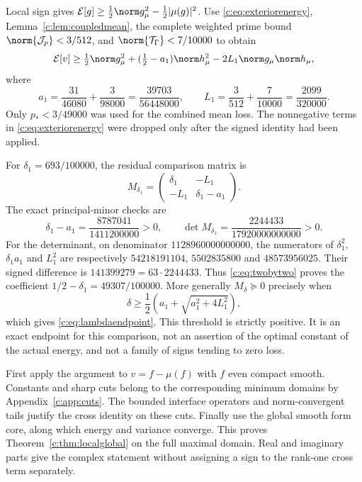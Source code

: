 \documentclass[11pt,a4paper]{article}
\numberwithin{equation}{section}
\theoremstyle{definition}\newtheorem{definition}[theorem]{Definition}
\theoremstyle{remark}\newtheorem{remark}[theorem]{Remark}
\newcommand{\E}{\mathcal E}\newcommand{\D}{\mathcal D}
\begin{document}
Local sign gives $\E[g]\ge\tfrac12\norm g_\mu^2-\tfrac12|\mu(g)|^2$.
Use \eqref{c:eq:exteriorenergy}, Lemma~\ref{c:lem:coupledmean},
the complete weighted prime bound $\norm{\mathcal J_p}<3/512$, and
$\norm{\mathcal T_\Gamma}<7/10000$ to obtain
\begin{equation}\label{c:eq:twobytwo}
 \E[v]\ge\tfrac12\norm g_\mu^2+(\tfrac12-a_1)\norm h_\mu^2
 -2L_1\norm g_\mu\norm h_\mu,
\end{equation}
where
\begin{equation}\label{c:eq:improvedconstants}
 a_1=\frac{31}{46080}+\frac3{98000}=\frac{39703}{56448000},
 \qquad L_1=\frac3{512}+\frac7{10000}=\frac{2099}{320000}.
\end{equation}
Only $p_*<3/49000$ was used for the combined mean loss. The nonnegative terms in \eqref{c:eq:exteriorenergy} were dropped only after the signed identity had been applied.

For $\delta_1=693/100000$, the residual comparison matrix is
\[
 M_{\delta_1}=\begin{pmatrix}\delta_1&-L_1\\-L_1&\delta_1-a_1\end{pmatrix}.
\]
The exact principal-minor checks are
\begin{equation}\label{c:eq:margin}
 \delta_1-a_1=\frac{8787041}{1411200000}>0,\qquad
 \det M_{\delta_1}=\frac{2244433}{17920000000000}>0.
\end{equation}
For the determinant, on denominator $1128960000000000$, the numerators of
$\delta_1^2$, $\delta_1a_1$ and $L_1^2$ are respectively
$54218191104$, $5502835800$ and $48573956025$.
Their signed difference is $141399279=63\cdot2244433$.
Thus \eqref{c:eq:twobytwo} proves the coefficient
$1/2-\delta_1=49307/100000$.
More generally $M_\delta\succeq0$ precisely when
\[
 \delta\ge\frac12\left(a_1+\sqrt{a_1^2+4L_1^2}\right),
\]
which gives \eqref{c:eq:lambdaendpoint}. This threshold is strictly positive.
It is an exact endpoint for this comparison, not an assertion of the optimal constant of the actual energy, and not a family of signs tending to zero loss.

First apply the argument to $v=f-\mu(f)$ with $f$ even compact smooth.
Constants and sharp cuts belong to the corresponding minimum domains by Appendix~\ref{c:app:cuts}.
The bounded interface operators and norm-convergent tails justify the cross identity on these cuts.
Finally use the global smooth form core, along which energy and variance converge.
This proves Theorem~\ref{c:thm:localglobal} on the full maximal domain.
Real and imaginary parts give the complex statement without assigning a sign to the rank-one cross term separately.
\end{document}
